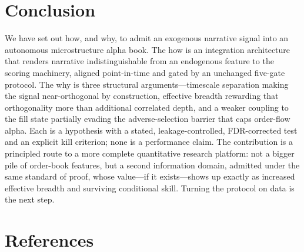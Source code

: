 \documentclass[11pt,a4paper]{article}
\theoremstyle{definition}
\theoremstyle{plain}
\begin{document}
\section{Conclusion}
\label{sec:conclusion}

We have set out how, and why, to admit an exogenous narrative signal into an autonomous microstructure
alpha book. The how is an integration architecture that renders narrative indistinguishable from an
endogenous feature to the scoring machinery, aligned point-in-time and gated by an unchanged five-gate
protocol. The why is three structural arguments---timescale separation making the signal near-orthogonal
by construction, effective breadth rewarding that orthogonality more than additional correlated depth,
and a weaker coupling to the fill state partially evading the adverse-selection barrier that caps
order-flow alpha. Each is a hypothesis with a stated, leakage-controlled, FDR-corrected test and an
explicit kill criterion; none is a performance claim. The contribution is a principled route to a more
complete quantitative research platform: not a bigger pile of order-book features, but a second
information domain, admitted under the same standard of proof, whose value---if it exists---shows up
exactly as increased effective breadth and surviving conditional skill. Turning the protocol on data
is the next step.

\section*{References}
\end{document}

